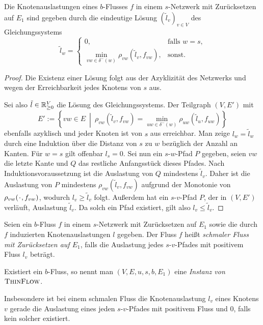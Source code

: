 \begin{proposition}\label{prop-congestion-labels-dijkstra}
	Die Knotenauslastungen eines $b$-Flusses $f$ in einem $s$-Netzwerk mit Zurücksetzen auf $E_1$ sind gegeben durch die eindeutige Lösung $(\tilde{l}_v)_{v\in V}$ des Gleichungssystems
	\[
	\tilde{l}_w = \begin{cases}
		0, & \text{falls $w=s$,}\\
		\min_{vw\in \delta^-(w)} \rho_{vw}(\tilde{l}_v, f_{vw}), & \text{sonst.}
	\end{cases}
	\]
\end{proposition}
\begin{proof}
	Die Existenz einer Lösung folgt aus der Azyklizität des Netzwerks und wegen der Erreichbarkeit jedes Knotens von $s$ aus.
	
	Sei also $\tilde{l}\in\mathbb{R}_{\geq 0}^V$ die Lösung des Gleichungssystems.
	Der Teilgraph $(V, E')$ mit \[
	E':= \left\{ vw\in E ~\middle\vert~ \rho_{vw}(\tilde{l}_v, f_{vw}) = \min_{uw\in\delta^-(w)}  \rho_{uw}(\tilde{l}_u, f_{uw}) \right\}
	\]
	ebenfalls azyklisch und jeder Knoten ist von $s$ aus erreichbar.
	Man zeige $l_w = \tilde{l}_w$ durch eine Induktion über die Distanz von $s$ zu $w$ bezüglich der Anzahl an Kanten.
	Für $w=s$ gilt offenbar $l_s = 0$.
	Sei nun ein $s$-$w$-Pfad $P$ gegeben, seien $vw$ die letzte Kante und $Q$ das restliche Anfangsstück dieses Pfades.
	Nach Induktionsvoraussetzung ist die Auslastung von $Q$ mindestens $\tilde{l}_v$.
	Daher ist die Auslastung von $P$ mindestens $\rho_{vw}(\tilde{l}_v, f_{vw})$ aufgrund der Monotonie von $\rho_{vw}(\PlH, f_{vw})$, wodurch $l_v \geq \tilde{l}_v$ folgt.
	Außerdem hat ein $s$-$v$-Pfad $P$, der in $(V, E')$ verläuft, Auslastung $\tilde{l}_v$.
	Da solch ein Pfad existiert, gilt also $l_v \leq \tilde{l}_v$.
\end{proof}

\newcommand{\problemThinFlow}{\textsc{ThinFlow}}
\begin{definition}
	Seien ein $b$-Fluss $f$ in einem $s$-Netzwerk mit Zurück\-setzen auf $E_1$ sowie die durch $f$ induzierten Knotenauslastungen $l$ gegeben.
	Der Fluss $f$ heißt \emph{schmaler Fluss mit Zurücksetzen auf $E_1$}, falls die Auslastung jedes $s$-$v$-Pfades mit positivem Fluss $l_v$ beträgt.
	
	Existiert ein $b$-Fluss, so nennt man $(V, E, u, s, b, E_1)$ eine \emph{Instanz von $\problemThinFlow$}.
\end{definition}

Insbesondere ist bei einem schmalen Fluss die Knotenauslastung $l_v$ eines Knotens $v$ gerade die Auslastung eines jeden $s$-$v$-Pfades mit positivem Fluss und $0$, falls kein solcher existiert.

